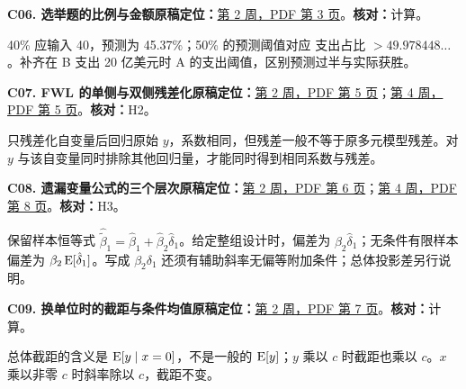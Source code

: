 \par\medskip\noindent\begin{minipage}{\linewidth}

\label{err:election}

\textbf{C06. 选举题的比例与金额}\quad\textbf{原稿定位：}\hyperref[src:w2p3]{第 2 周，PDF 第 3 页}。\quad\textbf{核对：}计算。\par

40\% 应输入 40，预测为 45.37\%；50\% 的预测阈值对应 支出占比 $>49.978448\ldots$。补齐在 B 支出 20 亿美元时 A 的支出阈值，区别预测过半与实际获胜。

\end{minipage}\par

\par\medskip\noindent\begin{minipage}{\linewidth}

\label{err:fwl-residual}

\textbf{C07. FWL 的单侧与双侧残差化}\quad\textbf{原稿定位：}\hyperref[src:w2p5]{第 2 周，PDF 第 5 页}；\hyperref[src:w4p5]{第 4 周，PDF 第 5 页}。\quad\textbf{核对：}H2。\par

只残差化自变量后回归原始 $y$，系数相同，但残差一般不等于原多元模型残差。对 $y$ 与该自变量同时排除其他回归量，才能同时得到相同系数与残差。

\end{minipage}\par

\par\medskip\noindent\begin{minipage}{\linewidth}

\label{err:ovb-levels}

\textbf{C08. 遗漏变量公式的三个层次}\quad\textbf{原稿定位：}\hyperref[src:w2p6]{第 2 周，PDF 第 6 页}；\hyperref[src:w4p8]{第 4 周，PDF 第 8 页}。\quad\textbf{核对：}H3。\par

保留样本恒等式 $\hat{\tilde\beta}_1=\hat\beta_1+\hat\beta_2\hat\delta_1$。给定整组设计时，偏差为 $\beta_2\hat\delta_1$；无条件有限样本偏差为 $\beta_2\operatorname{E}[\hat\delta_1]$。写成 $\beta_2\delta_1$ 还须有辅助斜率无偏等附加条件；总体投影差另行说明。

\end{minipage}\par

\par\medskip\noindent\begin{minipage}{\linewidth}

\label{err:unit-intercept}

\textbf{C09. 换单位时的截距与条件均值}\quad\textbf{原稿定位：}\hyperref[src:w2p7]{第 2 周，PDF 第 7 页}。\quad\textbf{核对：}计算。\par

总体截距的含义是 $\operatorname{E}[y\mid x=0]$，不是一般的 $\operatorname{E}[y]$；$y$ 乘以 $c$ 时截距也乘以 $c$。$x$ 乘以非零 $c$ 时斜率除以 $c$，截距不变。

\end{minipage}\par

